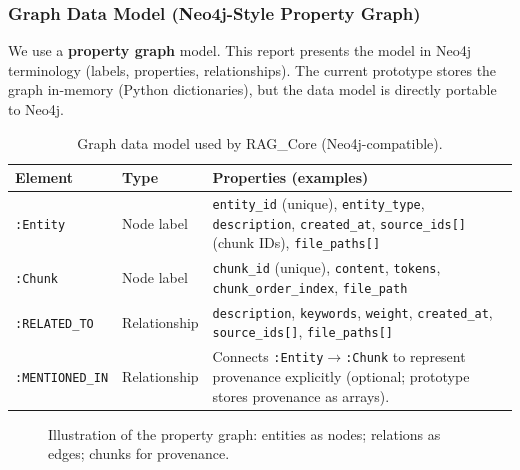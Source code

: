 \subsubsection{Graph Data Model (Neo4j-Style Property Graph)}
We use a \textbf{property graph} model. This report presents the model in Neo4j terminology (labels, properties, relationships). The current prototype stores the graph in-memory (Python dictionaries), but the data model is directly portable to Neo4j.

\begin{table}[h]
\centering
\begin{tabular}{|p{3.1cm}|p{3.0cm}|p{7.2cm}|}
\hline
\textbf{Element} & \textbf{Type} & \textbf{Properties (examples)} \\
\hline
\texttt{:Entity} & Node label & \texttt{entity\_id} (unique), \texttt{entity\_type}, \texttt{description}, \texttt{created\_at}, \texttt{source\_ids[]} (chunk IDs), \texttt{file\_paths[]} \\
\hline
\texttt{:Chunk} & Node label & \texttt{chunk\_id} (unique), \texttt{content}, \texttt{tokens}, \texttt{chunk\_order\_index}, \texttt{file\_path} \\
\hline
\texttt{:RELATED\_TO} & Relationship & \texttt{description}, \texttt{keywords}, \texttt{weight}, \texttt{created\_at}, \texttt{source\_ids[]}, \texttt{file\_paths[]} \\
\hline
\texttt{:MENTIONED\_IN} & Relationship & Connects \texttt{:Entity}$\rightarrow$\texttt{:Chunk} to represent provenance explicitly (optional; prototype stores provenance as arrays). \\
\hline
\end{tabular}
\caption{Graph data model used by RAG\_Core (Neo4j-compatible).}
\end{table}

\begin{figure}[h]
\centering
{}
\caption{Illustration of the property graph: entities as nodes; relations as edges; chunks for provenance.}
\end{figure}

